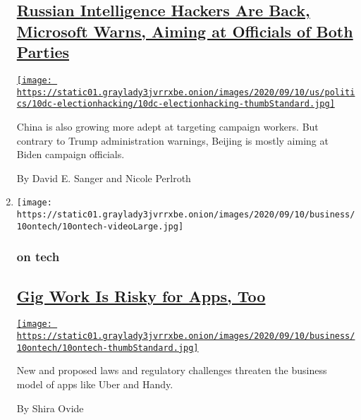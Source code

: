 \begin{enumerate}
  \hypertarget{russian-intelligence-hackers-are-back-microsoft-warns-aiming-at-officials-of-both-parties}{%
  \subsection{\texorpdfstring{\href{/2020/09/10/us/politics/russian-hacking-microsoft-biden-trump.html}{Russian
  Intelligence Hackers Are Back, Microsoft Warns, Aiming at Officials of
  Both
  Parties}}{Russian Intelligence Hackers Are Back, Microsoft Warns, Aiming at Officials of Both Parties}}\label{russian-intelligence-hackers-are-back-microsoft-warns-aiming-at-officials-of-both-parties}}

  \href{/2020/09/10/us/politics/russian-hacking-microsoft-biden-trump.html}{\texttt{[image: https://static01.graylady3jvrrxbe.onion/images/2020/09/10/us/politics/10dc-electionhacking/10dc-electionhacking-thumbStandard.jpg]}}

  China is also growing more adept at targeting campaign workers. But
  contrary to Trump administration warnings, Beijing is mostly aiming at
  Biden campaign officials.

  By David E. Sanger and Nicole Perlroth
\item
  \texttt{[image: https://static01.graylady3jvrrxbe.onion/images/2020/09/10/business/10ontech/10ontech-videoLarge.jpg]}

  \hypertarget{on-tech}{%
  \subsubsection{on tech}\label{on-tech}}

  \hypertarget{gig-work-is-risky-for-apps-too}{%
  \subsection{\texorpdfstring{\href{/2020/09/11/technology/gig-work-business-model.html}{Gig
  Work Is Risky for Apps,
  Too}}{Gig Work Is Risky for Apps, Too}}\label{gig-work-is-risky-for-apps-too}}

  \href{/2020/09/11/technology/gig-work-business-model.html}{\texttt{[image: https://static01.graylady3jvrrxbe.onion/images/2020/09/10/business/10ontech/10ontech-thumbStandard.jpg]}}

  New and proposed laws and regulatory challenges threaten the business
  model of apps like Uber and Handy.

  By Shira Ovide
\end{enumerate}

